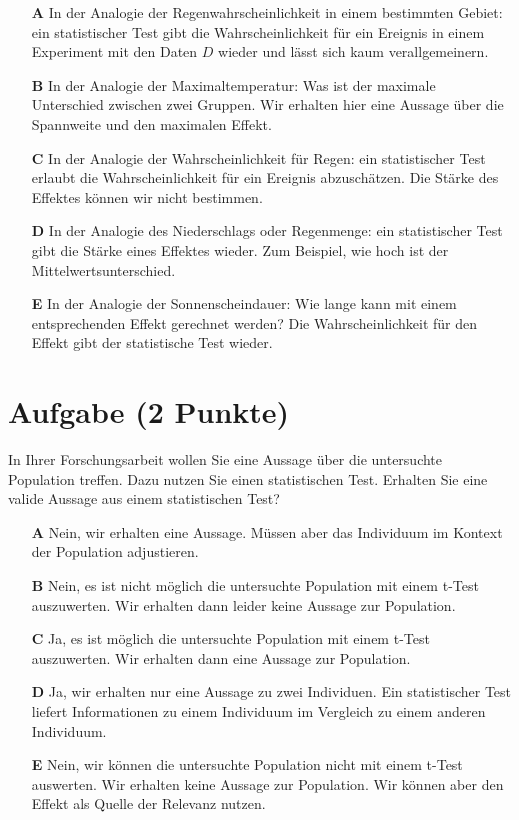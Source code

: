 \documentclass[a4paper, 9pt]{scrartcl}\usepackage[]{graphicx}\usepackage[]{xcolor}
\begin{document}
\begin{enumerate}
\item [\textbf{A} \msquare] In der Analogie der Regenwahrscheinlichkeit in einem bestimmten Gebiet: ein statistischer Test gibt die Wahrscheinlichkeit für ein Ereignis in einem Experiment mit den Daten $D$ wieder und lässt sich kaum verallgemeinern.
\item [\textbf{B} \msquare] In der Analogie der Maximaltemperatur: Was ist der maximale Unterschied zwischen zwei Gruppen. Wir erhalten hier eine Aussage über die Spannweite und den maximalen Effekt.
\item [\textbf{C} \msquare] In der Analogie der Wahrscheinlichkeit für Regen: ein statistischer Test erlaubt die Wahrscheinlichkeit für ein Ereignis abzuschätzen. Die Stärke des Effektes können wir nicht bestimmen.
\item [\textbf{D} \msquare] In der Analogie des Niederschlags oder Regenmenge: ein statistischer Test gibt die Stärke eines Effektes wieder. Zum Beispiel, wie hoch ist der Mittelwertsunterschied.
\item [\textbf{E} \msquare] In der Analogie der Sonnenscheindauer: Wie lange kann mit einem entsprechenden Effekt gerechnet werden? Die Wahrscheinlichkeit für den Effekt gibt der statistische Test wieder.
\end{enumerate}

\section{Aufgabe \hfill (2 Punkte)}



In Ihrer Forschungsarbeit wollen Sie eine Aussage über die untersuchte Population treffen. Dazu nutzen Sie einen statistischen Test. Erhalten Sie eine valide Aussage aus einem statistischen Test?



\begin{enumerate}
\item [\textbf{A} \msquare] Nein, wir erhalten eine Aussage. Müssen aber das Individuum im Kontext der Population adjustieren.
\item [\textbf{B} \msquare] Nein, es ist nicht möglich die untersuchte Population mit einem t-Test auszuwerten. Wir erhalten dann leider keine Aussage zur Population.
\item [\textbf{C} \msquare] Ja, es ist möglich die untersuchte Population mit einem t-Test auszuwerten. Wir erhalten dann eine Aussage zur Population.
\item [\textbf{D} \msquare] Ja, wir erhalten nur eine Aussage zu zwei Individuen. Ein statistischer Test liefert Informationen zu einem Individuum im Vergleich zu einem anderen Individuum.
\item [\textbf{E} \msquare] Nein, wir können die untersuchte Population nicht mit einem t-Test auswerten. Wir erhalten keine Aussage zur Population. Wir können aber den Effekt als Quelle der Relevanz nutzen.
\end{enumerate}
\end{document}
